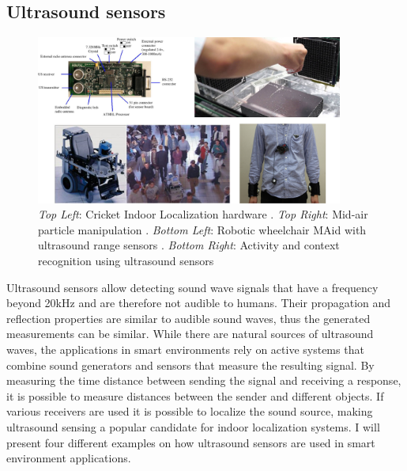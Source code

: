 \subsection{Ultrasound sensors}
\begin{figure}[h]
\centering
\includegraphics[width=0.9\textwidth]{images/rel_tech_ultra}
\caption{\emph{Top Left}: Cricket Indoor Localization hardware \cite{priyantha2000cricket}. \emph{Top Right}: Mid-air particle manipulation \cite{ochiai2013three}. \emph{Bottom Left}: Robotic wheelchair MAid with ultrasound range sensors \cite{prassler2001robotics}. \emph{Bottom Right}: Activity and context recognition using ultrasound sensors \cite{watanabe2013ultrasound}}
\label{fig:rel_tech_ultra}
\end{figure}
Ultrasound sensors allow detecting sound wave signals that have a frequency beyond 20kHz and are therefore not audible to humans. Their propagation and reflection properties are similar to audible sound waves, thus the generated measurements can be similar. While there are natural sources of ultrasound waves, the applications in smart environments rely on active systems that combine sound generators and sensors that measure the resulting signal. By measuring the time distance between sending the signal and receiving a response, it is possible to measure distances between the sender and different objects.  If various receivers are used it is possible to localize the sound source, making ultrasound sensing a popular candidate for indoor localization systems. I will present four different examples on how ultrasound sensors are used in smart environment applications.

